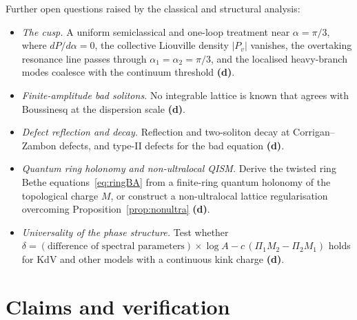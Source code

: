 \documentclass[11pt,a4paper]{article}
\newcommand{\lab}[1]{{\normalfont\sffamily\footnotesize\bfseries(#1)}}
\newcommand{\Ld}{\lab{d}}
\theoremstyle{remark}
\begin{document}
Further open questions raised by the classical and structural analysis:
\begin{itemize}
\item \emph{The cusp.} A uniform semiclassical and one-loop treatment near $\alpha=\pi/3$, where $dP/d\alpha=0$, the collective Liouville density $|P_v|$ vanishes, the overtaking resonance line passes through $\alpha_1=\alpha_2=\pi/3$, and the localised heavy-branch modes coalesce with the continuum threshold \Ld.
\item \emph{Finite-amplitude bad solitons.} No integrable lattice is known that agrees with Boussinesq at the dispersion scale \Ld.
\item \emph{Defect reflection and decay.} Reflection and two-soliton decay at Corrigan--Zambon defects, and type-II defects for the bad equation \Ld.
\item \emph{Quantum ring holonomy and non-ultralocal QISM.} Derive the twisted ring Bethe equations~\eqref{eq:ringBA} from a finite-ring quantum holonomy of the topological charge $M$, or construct a non-ultralocal lattice regularisation overcoming Proposition~\ref{prop:nonultra} \Ld.
\item \emph{Universality of the phase structure.} Test whether $\delta=(\text{difference of spectral parameters})\times\log A-c\,(\Pi_1M_2-\Pi_2M_1)$ holds for KdV and other models with a continuous kink charge \Ld.
\end{itemize}

\appendix

\section{Claims and verification}\label{app:claims}
\end{document}

